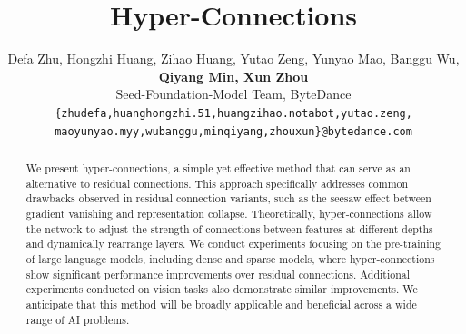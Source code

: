 \documentclass{article} %
\title{Hyper-Connections}
\author{Defa Zhu, Hongzhi Huang, Zihao Huang, Yutao Zeng, Yunyao Mao, Banggu Wu,\\
\textbf{Qiyang Min, Xun Zhou} \\
Seed-Foundation-Model Team, ByteDance\\
\texttt{\{zhudefa,huanghongzhi.51,huangzihao.notabot,yutao.zeng,} \\
\texttt{maoyunyao.myy,wubanggu,minqiyang,zhouxun\}@bytedance.com} \\
}
\begin{document}
\maketitle

\begin{abstract}
We present hyper-connections, a simple yet effective method that can serve as an alternative to residual connections. This approach specifically addresses common drawbacks observed in residual connection variants, such as the seesaw effect between gradient vanishing and representation collapse. Theoretically, hyper-connections allow the network to adjust the strength of connections between features at different depths and dynamically rearrange layers. We conduct experiments focusing on the pre-training of large language models, including dense and sparse models, where hyper-connections show significant performance improvements over residual connections. Additional experiments conducted on vision tasks also demonstrate similar improvements. We anticipate that this method will be broadly applicable and beneficial across a wide range of AI problems.

\end{abstract}
\end{document}
